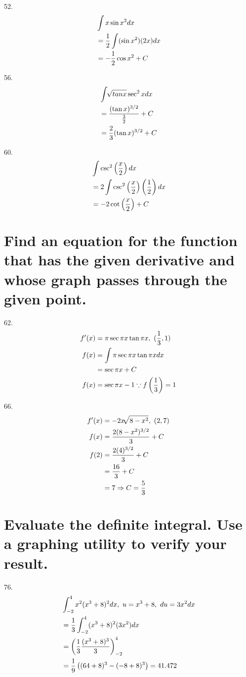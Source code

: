 \documentclass[11pt]{article}
\newcommand*{\set}{\setcounter{equation}{0}}
\newcommand*{\lt}{\left}
\newcommand*{\rt}{\right}
\begin{document}
52.\begin{align}
    \set
    &\int x\sin x^2dx\\
    &=\frac{1}{2}\int(\sin x^2)(2x)dx\\
    &=-\frac{1}{2}\cos x^2+C
\end{align}

56.\begin{align}
    \set
    &\int\sqrt[]{tanx}\sec^2xdx\\
    &=\frac{(\tan x)^{3/2}}{\frac{3}{2}}+C\\
    &=\frac{2}{3}(\tan x)^{3/2}+C
\end{align}

60.\begin{align}
    \set
    &\int\csc^2\lt(\frac{x}{2}\rt)dx\\
    &=2\int\csc^2\lt(\frac{x}{2}\rt)\lt(\frac{1}{2}\rt)dx\\
    &=-2\cot\lt(\frac{x}{2}\rt)+C
\end{align}

\section{Find an equation for the function that has
the given derivative and whose graph passes through the given
point.}
62.\begin{align}
    \set
    f'(x)&=\pi\sec\pi x\tan\pi x,\,\, (\frac{1}{3}, 1)\\
    f(x)&=\int\pi\sec\pi x\tan\pi xdx\\
    &=\sec\pi x+C\\
    f(x)&=\sec\pi x-1\because f\lt(\frac{1}{3}\rt)=1
\end{align}

66.\begin{align}
    \set
    f'(x)&=-2x\sqrt[]{8-x^2},\,\, (2, 7)\\
    f(x)&=\frac{2(8-x^2)^{3/2}}{3}+C\\
    f(2)&=\frac{2(4)^{3/2}}{3}+C\\
    &=\frac{16}{3}+C\\
    &=7\Rightarrow C=\frac{5}{3}
\end{align}

\section{Evaluate the definite integral. Use a graphing
utility to verify your result.}
76.\begin{align}
    \set
    &\int_{-2}^{4}x^2(x^3+8)^2dx,\,\, u=x^3+8,\,\, du=3x^2dx\\
    &=\frac{1}{3}\int_{-2}^{4}(x^3+8)^2(3x^2)dx\\
    &=\lt(\frac{1}{3}\frac{(x^3+8)^3}{3}\rt)_{-2}^4\\
    &=\frac{1}{9}\lt((64+8)^3-(-8+8)^3\rt)=41.472
\end{align}
\end{document}
